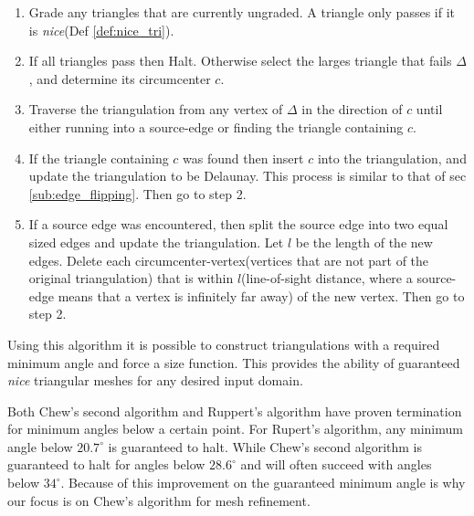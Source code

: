 \documentclass[../fem.tex]{subfiles}
\begin{document}
\begin{enumerate}[label=\arabic*.]
  \item Grade any triangles that are currently ungraded. A triangle only passes
    if it is \textit{nice}(Def \ref{def:nice_tri}).
  \item If all triangles pass then Halt. Otherwise select the larges triangle
    that fails $\Delta$, and determine its circumcenter $c$.
  \item Traverse the triangulation from any vertex of $\Delta$ in the direction
    of $c$ until either running into a source-edge or finding the triangle
    containing $c$.
  \item If the triangle containing $c$ was found then insert $c$ into the
    triangulation, and update the triangulation to be Delaunay. This process is
    similar to that of sec \ref{sub:edge_flipping}. Then go to step 2.
  \item If a source edge was encountered, then split the source edge into two
    equal sized edges and update the triangulation. Let $l$ be the length of
    the new edges. Delete each circumcenter-vertex(vertices that are not part
    of the original triangulation) that is within $l$(line-of-sight distance,
    where a source-edge means that a vertex is infinitely far away) of the new
    vertex. Then go to step 2.
\end{enumerate}

Using this algorithm it is possible to construct triangulations with a required
minimum angle and force a size function. This provides the ability of
guaranteed \textit{nice} triangular meshes for any desired input domain.

Both Chew's second algorithm and Ruppert's algorithm have proven termination
for minimum angles below a certain point. For Rupert's algorithm, any minimum
angle below $20.7^{\circ}$ is guaranteed to halt. While Chew's second algorithm
is guaranteed to halt for angles below $28.6^{\circ}$ and will often succeed
with angles below $34^{\circ}$. Because of this improvement on the guaranteed
minimum angle is why our focus is on Chew's algorithm for mesh refinement.
\end{document}
